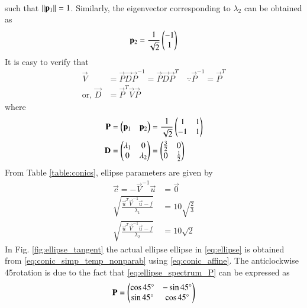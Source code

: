 \begin{enumerate}[label=\thesubsection.\arabic*.,ref=\thesubsection.\theenumi]
\begin{align}
\end{align}
such that $\left\lVert\mathbf{p}_1\right\rVert = 1$.  Similarly, the eigenvector corresponding to $\lambda_2$ can be obtained as
\begin{align}
 \mathbf{p}_2 = \frac{1}{\sqrt{2}}\begin{pmatrix}-1 \\ 1\end{pmatrix}
\end{align}
It is easy to verify that 
\begin{align}
\label{eq:ellipse_spectrum}
\vec{V} &= \vec{P}\vec{D}\vec{P}^{-1}=\vec{P}\vec{D}\vec{P}^T \quad \because \vec{P}^{-1} = \vec{P}^{T}
\\
\text{or, } \vec{D} &= \vec{P}^T\vec{V}\vec{P}
\end{align}
where 
\begin{align}
\label{eq:ellipse_spectrum_P}
\mathbf{P} & =\begin{pmatrix}\mathbf{p}_1 & \mathbf{p}_2\end{pmatrix} = \frac{1}{\sqrt{2}}\begin{pmatrix}1 & 1\\ -1 & 1\end{pmatrix}
\\
 \mathbf{D} &= \begin{pmatrix}\lambda_1 & 0 \\ 0 & \lambda_2\end{pmatrix} =\begin{pmatrix}\frac{3}{2} & 0\\ 0 & \frac{1}{2}\end{pmatrix}
\label{eq:ellipse_spectrum_D}
\end{align}
From Table \ref{table:conics}, ellipse parameters are given by
\begin{align}
\vec{c} =-\vec{V}^{-1}\vec{u} &= \vec{0}
\\
\sqrt{\frac{\vec{u}^T\vec{V}^{-1}\vec{u}-f}{\lambda_1}} &= 10 \sqrt{\frac{2}{3}}
\\
\sqrt{\frac{\vec{u}^T\vec{V}^{-1}\vec{u}-f}{\lambda_2}} &= 10 \sqrt{2}
\end{align}
In Fig. \ref{fig:ellipse_tangent} the actual ellipse ellipse in \eqref{eq:ellipse} is obtained from \eqref{eq:conic_simp_temp_nonparab} using \eqref{eq:conic_affine}.  The anticlockwise 45\degree rotation is due to the fact that 
\eqref{eq:ellipse_spectrum_P} can be expressed as
\begin{align}
\label{eq:ellipse_spectrum_P_rot}
\vec{P}  = \myvec{\cos 45\degree & -\sin 45\degree\\ \sin 45\degree & \cos 45\degree}

\end{align}
\end{enumerate}
